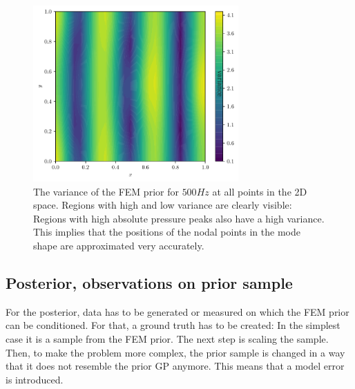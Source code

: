 \documentclass[%
  a4paper,oneside,%
  11pt,%
  smallchapters,
  style=printdev,
  extramargin,
  green,%
  rgb, <cmyk>
  ]{tubsbook}
\begin{document}
\begin{figure}[!ht]
\includegraphics[width=0.7\textwidth]{pics/VarField.pdf}
\centering
\caption[Variance of the FEM prior at 500Hz]{The variance of the FEM prior for $500Hz$ at all points in the 2D space. Regions with high and low variance are clearly visible: Regions with high absolute pressure peaks also have a high variance. This implies that the positions of the nodal points in the mode shape are approximated very accurately.}
\label{fig:varFieldPrior}
\end{figure}
%
%
%
%
\FloatBarrier

\subsection{Posterior, observations on prior sample}
For the posterior, data has to be generated or measured on which the FEM prior can be conditioned. For that, a ground truth has to be created: In the simplest case it is a sample from the FEM prior. The next step is scaling the sample. Then, to make the problem more complex, the prior sample is changed in a way that it does not resemble the prior GP anymore. This means that a model error is introduced.
\end{document}
